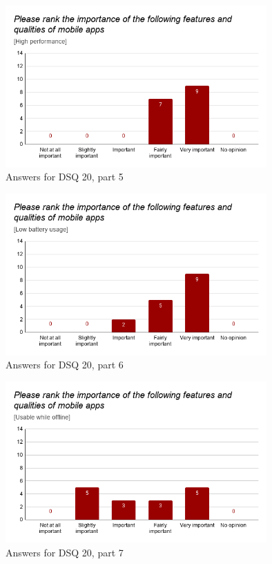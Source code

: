 \documentclass[a4paper,12pt]{article}
\begin{document}
\begin{figure}[ht!]
    \centering
    \includegraphics[width=10cm]{img/Results/dsq20_5.png}
    \caption{Answers for DSQ 20, part 5}
    \label{fig:res_devq20_5}
\end{figure}

\begin{figure}[ht!]
    \centering
    \includegraphics[width=10cm]{img/Results/dsq20_6.png}
    \caption{Answers for DSQ 20, part 6}
    \label{fig:res_devq20_6}
\end{figure}
\newpage

\begin{figure}[ht!]
    \centering
    \includegraphics[width=10cm]{img/Results/dsq20_7.png}
    \caption{Answers for DSQ 20, part 7}
    \label{fig:res_devq20_7}
\end{figure}
\end{document}
